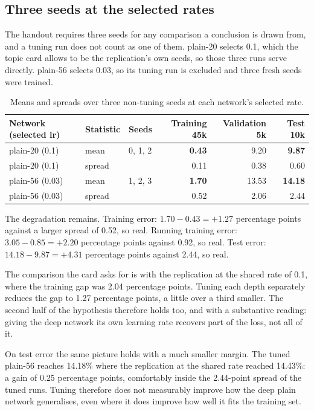 \documentclass[11pt,a4paper]{article}
\newcommand{\pp}{percentage points}
\begin{document}
\subsection{Three seeds at the selected rates}

The handout requires three seeds for any comparison a conclusion is drawn from,
and a tuning run does not count as one of them. plain-20 selects 0.1, which the
topic card allows to be the replication's own seeds, so those three runs serve
directly. plain-56 selects 0.03, so its tuning run is excluded and three fresh
seeds were trained.

\begin{table}[h]
\centering
\begin{tabular}{@{}lllrrr@{}}
\toprule
Network (selected lr) & Statistic & Seeds & Training 45k & Validation 5k & Test 10k \\
\midrule
plain-20 (0.1) & mean & 0, 1, 2 & \textbf{0.43} & 9.20 & \textbf{9.87} \\
plain-20 (0.1) & spread & & 0.11 & 0.38 & 0.60 \\
\midrule
plain-56 (0.03) & mean & 1, 2, 3 & \textbf{1.70} & 13.53 & \textbf{14.18} \\
plain-56 (0.03) & spread & & 0.52 & 2.06 & 2.44 \\
\bottomrule
\end{tabular}
\caption{Means and spreads over three non-tuning seeds at each network's
selected rate.}\label{tab:tuned}
\end{table}

The degradation remains. Training error: $1.70 - 0.43 = +1.27$ \pp{} against a
larger spread of 0.52, so real. Running training error: $3.05 - 0.85 = +2.20$
\pp{} against 0.92, so real. Test error: $14.18 - 9.87 = +4.31$ \pp{} against
2.44, so real.

The comparison the card asks for is with the replication at the shared rate of
0.1, where the training gap was 2.04 \pp. Tuning each depth separately reduces
the gap to 1.27 \pp{}, a little over a third smaller. The second half of the
hypothesis therefore holds too, and with a substantive reading: giving the deep
network its own learning rate recovers part of the loss, not all of it.

On test error the same picture holds with a much smaller margin. The tuned
plain-56 reaches 14.18\% where the replication at the shared rate reached
14.43\%: a gain of 0.25 \pp, comfortably inside the 2.44-point spread of the
tuned runs. Tuning therefore does not measurably improve how the deep plain
network generalises, even where it does improve how well it fits the training
set.
\end{document}

